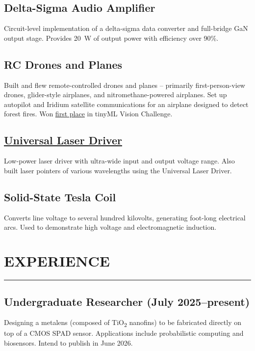 	\subsection{Delta-Sigma Audio Amplifier}
	Circuit-level implementation of a delta-sigma data converter and full-bridge GaN output stage. Provides \qty{20}{\watt} of output power with efficiency over 90\%.
	\subsection{RC Drones and Planes}
	Built and flew remote-controlled drones and planes -- primarily first-person-view drones, glider-style airplanes, and nitromethane-powered airplanes. Set up autopilot and Iridium satellite communications for an airplane designed to detect forest fires. Won \href{https://www.hackster.io/team-sol/tinyml-aerial-forest-fire-detection-78ec6b}{first place} in tinyML Vision Challenge.
	\subsection{\href{https://github.com/SAR-mango/Universal-Laser-Driver}{Universal Laser Driver}}
	Low-power laser driver with ultra-wide input and output voltage range. Also built laser pointers of various wavelengths using the Universal Laser Driver.
	\subsection{Solid-State Tesla Coil}
	Converts line voltage to several hundred kilovolts, generating foot-long electrical arcs. Used to demonstrate high voltage and electromagnetic induction.
	\section*{EXPERIENCE}
	\hrule\smallskip
	\subsection{Undergraduate Researcher (July 2025--present)}
		Designing a metalens (composed of TiO\textsubscript{2} nanofins) to be fabricated directly on top of a CMOS SPAD sensor. Applications include probabilistic computing and biosensors. Intend to publish in June 2026.
